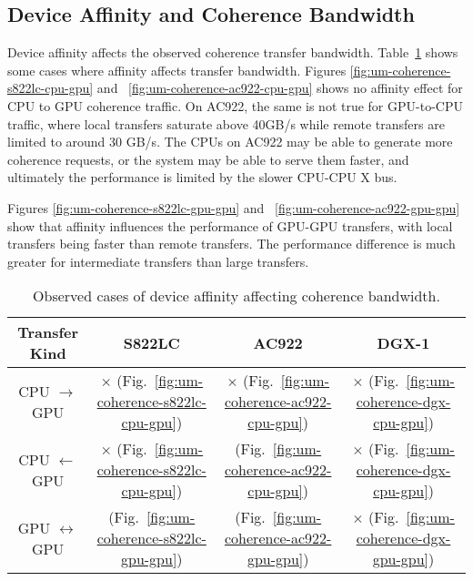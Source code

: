 \subsection{Device Affinity and Coherence Bandwidth}

Device affinity affects the observed coherence transfer bandwidth.
Table~\ref{tab:um-coherence-affinity} shows some cases where affinity affects transfer bandwidth.
Figures \ref{fig:um-coherence-s822lc-cpu-gpu} and ~\ref{fig:um-coherence-ac922-cpu-gpu} shows no affinity effect for CPU to GPU coherence traffic.
On AC922, the same is not true for GPU-to-CPU traffic, where local transfers saturate above 40GB/s while remote transfers are limited to around 30 GB/s.
The CPUs on AC922 may be able to generate more coherence requests, or the system may be able to serve them faster, and ultimately the performance is limited by the slower CPU-CPU X bus.

Figures \ref{fig:um-coherence-s822lc-gpu-gpu} and ~\ref{fig:um-coherence-ac922-gpu-gpu} show that affinity influences the performance of GPU-GPU transfers, with local transfers being faster than remote transfers.
The performance difference is much greater for intermediate transfers than large transfers.

\begin{table}[ht]
	\centering
	\caption[Device Affinity and Coherence Bandwidth]{
		Observed cases of device affinity affecting coherence bandwidth.
	}
	\label{tab:um-coherence-affinity}
	\begin{tabular}{cccc}
		\hline
		\textbf{Transfer Kind}    & \textbf{S822LC}                                         & \textbf{AC922}                                         & \textbf{DGX-1}                            \\ \hline 
		CPU $\rightarrow$     GPU & $\times$   (Fig.~\ref{fig:um-coherence-s822lc-cpu-gpu}) & $\times$   (Fig.~\ref{fig:um-coherence-ac922-cpu-gpu}) & $\times$ (Fig.~\ref{fig:um-coherence-dgx-cpu-gpu}) \\ \hline
		CPU $\leftarrow$      GPU & $\times$   (Fig.~\ref{fig:um-coherence-s822lc-cpu-gpu}) & \checkmark (Fig.~\ref{fig:um-coherence-ac922-cpu-gpu}) & $\times$ (Fig.~\ref{fig:um-coherence-dgx-cpu-gpu}) \\ \hline
		GPU $\leftrightarrow$ GPU & \checkmark (Fig.~\ref{fig:um-coherence-s822lc-gpu-gpu}) & \checkmark (Fig.~\ref{fig:um-coherence-ac922-gpu-gpu}) & $\times$ (Fig.~\ref{fig:um-coherence-dgx-gpu-gpu}) \\ \hline
	\end{tabular}
\end{table}


